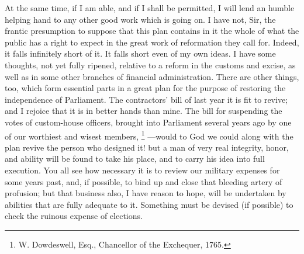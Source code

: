 At the same time, if I am able, and if I shall be permitted, I will lend an humble helping hand to any other good work which is going on. I have not, Sir, the frantic presumption to suppose that this plan contains in it the whole of what the public has a right to expect in the great work of reformation they call for. Indeed, it falls infinitely short of it. It falls short even of my own ideas. I have some thoughts, not yet fully ripened, relative to a reform in the customs and excise, as well as in some other branches of financial administration. There are other things, too, which form essential parts in a great plan for the purpose of restoring the independence of Parliament. The contractors' bill of last year it is fit to revive; and I rejoice that it is in better hands than mine. The bill for suspending the votes of custom-house officers, brought into Parliament several years ago by one of our worthiest and wisest members,
\footnote{ W. Dowdeswell, Esq., Chancellor of the Exchequer, 1765.}
—would to God we could along with the plan revive the person who designed it! but a man of very real integrity, honor, and ability will be found to take his place, and to carry his idea into full execution. You all see how necessary it is to review our military expenses for some years past, and, if possible, to bind up and close that bleeding artery of profusion; but that business also, I have reason to hope, will be undertaken by abilities that are fully adequate to it. Something must be devised (if possible) to check the ruinous expense of elections.

